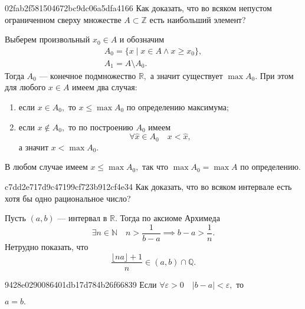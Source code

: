     \begin{note}{02fab2f581504672bc9dc06a5dfa4166}
        Как доказать, что во всяком непустом ограниченном сверху множестве \( A
        \subset \mathbb Z \) есть наибольший элемент?

        \begin{cloze}{1}
            Выберем произвольный \( x_0 \in A \) и обозначим \[
                \begin{gathered}
                    A_0 = \{ x \mid x \in A \land x \geqslant x_0 \},  \\
                    A_1 = A \setminus A_0.
                \end{gathered}
            \]
            Тогда \( A_0 \) --- конечное подмножество \( \mathbb R, \) а значит
            существует \( \max A_0. \) При этом для любого \( x \in A \) имеем
            два случая:
            \begin{enumerate}
                \item если \( x \in A_0,  \) то \( x \leqslant \max A_0 \) по
                    определению максимума;
                \item если \( x \not\in A_0,  \) то по построению \( A_0 \)
                    имеем \[ \forall \hat{x} \in A_0 \quad x < \hat{x}, \] а
                    значит \( x < \max A_0. \)
            \end{enumerate}

            В любом случае имеем \( x \leqslant \max A_0, \) так что \( \max A_0
            = \max A \) по определению.
        \end{cloze}
    \end{note}

    \begin{note}{c7dd2e717d9c47199cf723b912cf4e34}
        Как доказать, что во всяком интервале есть хотя бы одно рациональное
        число?

        \begin{cloze}{1}
            Пусть \( (a, b) \) --- интервал в \( \mathbb R. \) Тогда по аксиоме
            Архимеда \[
               \exists n \in \mathbb N \quad n > \frac{1}{b - a} \implies b - a
               > \frac{1}{n}.
            \] Нетрудно показать, что \[
                \dfrac{\lfloor na \rfloor + 1}{n} \in (a, b) \cap \mathbb Q .
            \]
        \end{cloze}
    \end{note}

    \begin{note}{9428e0290086401db17d784b26f66839}
        Если \( \forall \varepsilon > 0 \quad |b - a| < \varepsilon, \) то
        \begin{icloze}{1}\( a = b. \)\end{icloze}
    \end{note}


